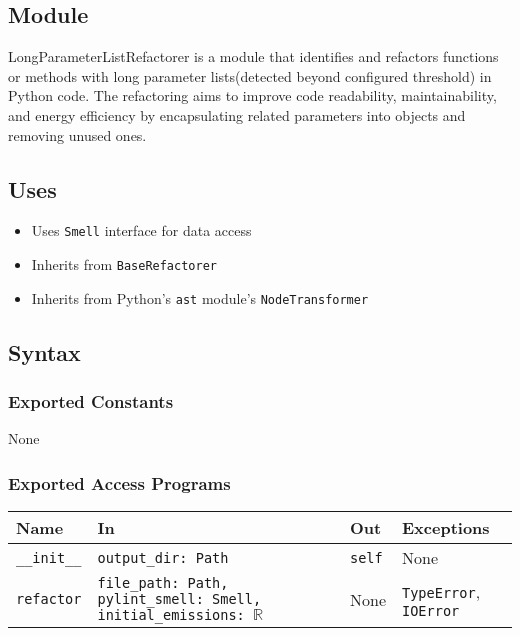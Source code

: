\documentclass[12pt, titlepage]{article}
\begin{document}
\subsection{Module}

LongParameterListRefactorer is a module that identifies and refactors functions or methods with long parameter lists(detected beyond configured threshold) in Python code. The refactoring aims to improve code readability, maintainability, and energy efficiency by encapsulating related parameters into objects and removing unused ones.

\subsection{Uses}

\begin{itemize}
  \item Uses \texttt{Smell} interface for data access
  \item Inherits from \texttt{BaseRefactorer}
  \item Inherits from Python's \texttt{ast} module's \texttt{NodeTransformer}
\end{itemize}

\subsection{Syntax}

\subsubsection{Exported Constants}

None

\subsubsection{Exported Access Programs}

\begin{center}
\begin{tabularx}{\linewidth}{|l|>{\raggedright\arraybackslash}X|l|l|}
\hline
\textbf{Name} & \textbf{In} & \textbf{Out} & \textbf{Exceptions} \\
\hline
\texttt{\_\_init\_\_} & \texttt{output\_dir: Path} & \texttt{self} & None \\
\hline
\texttt{refactor} & \texttt{file\_path: Path, pylint\_smell: Smell, initial\_emissions: $\mathbb{R}$} & None & \texttt{TypeError}, \texttt{IOError} \\
\hline
\end{tabularx}
\end{center}
\end{document}
